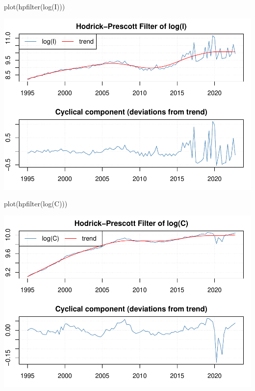 \documentclass[
]{article}
\newenvironment{Shaded}{\begin{snugshade}}{\end{snugshade}}
\newcommand{\FunctionTok}[1]{\textcolor[rgb]{0.00,0.00,0.00}{#1}}
\newcommand{\NormalTok}[1]{#1}
\begin{document}
\begin{Shaded}
\begin{Highlighting}[]
\FunctionTok{plot}\NormalTok{(}\FunctionTok{hpfilter}\NormalTok{(}\FunctionTok{log}\NormalTok{(I)))}
\end{Highlighting}
\end{Shaded}

\includegraphics{AdvMacro2_Assignment1_files/figure-latex/unnamed-chunk-4-3.pdf}

\begin{Shaded}
\begin{Highlighting}[]
\FunctionTok{plot}\NormalTok{(}\FunctionTok{hpfilter}\NormalTok{(}\FunctionTok{log}\NormalTok{(C)))}
\end{Highlighting}
\end{Shaded}

\includegraphics{AdvMacro2_Assignment1_files/figure-latex/unnamed-chunk-4-4.pdf}
\end{document}
